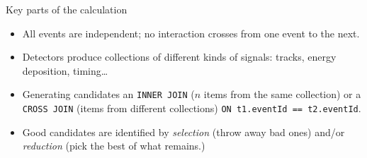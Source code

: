 \documentclass[aspectratio=169]{beamer}
\begin{document}
%
%
%
%
%
%
%
%

\begin{frame}{Key parts of the calculation}
\Large
\begin{itemize}\setlength{\itemsep}{0.25 cm}
\item All events are independent; no interaction crosses from one event to the next.
\item Detectors produce collections of different kinds of signals: tracks, energy deposition, timing\ldots
\item Generating candidates an \texttt{INNER JOIN} ($n$ items from the same collection) or a \texttt{CROSS JOIN} (items from different collections) \texttt{ON t1.eventId == t2.eventId}.
\item Good candidates are identified by {\it selection} (throw away bad ones) and/or {\it reduction} (pick the best of what remains.)
\end{itemize}
\end{frame}
\end{document}
